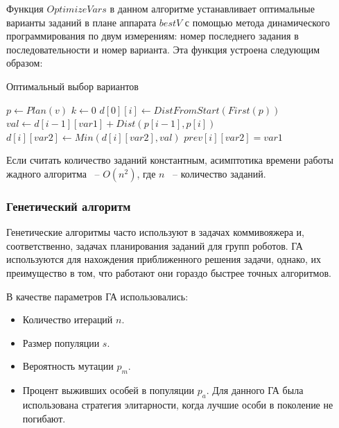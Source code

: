 \documentclass[a4paper,14pt,russian]{article}
\begin{document}
Функция $OptimizeVars$ в данном алгоритме устанавливает оптимальные варианты заданий в плане аппарата $bestV$ с помощью метода динамического программирования по двум измерениям: номер последнего задания в последовательности и номер варианта. Эта функция устроена следующим образом:

\pagebreak

\begin{algorithm}
\caption{Оптимальный выбор вариантов}\label{alg:dynamic}
\begin{algorithmic}[1]
    \State $p \gets Plan(v)$
    \State $k \gets 0$
        \State $d[0][i] \gets DistFromStart(First(p))$
    \EndFor
                \State $val \gets d[i - 1][var1] + Dist(p[i - 1], p[i])$
                    \State $d[i][var2] \gets Min(d[i][var2], val)$
                    \State $prev[i][var2] = var1$
                \EndIf
            \EndFor
        \EndFor
    \EndFor
    \State {}
\EndProcedure
\end{algorithmic}
\end{algorithm}

Если считать количество заданий константным, асимптотика времени работы жадного алгоритма ~-- $O(n^2)$, где $n$ ~-- количество заданий.


\subsubsection{Генетический алгоритм}
Генетические алгоритмы часто используют в задачах коммивояжера и, соответственно, задачах планирования заданий для групп роботов. ГА используются для нахождения приближенного решения задачи, однако, их преимущество в том, что работают они гораздо быстрее точных алгоритмов.

В качестве параметров ГА использовались:
\begin{itemize}
\item Количество итераций $n$.
\item Размер популяции $s$.
\item Вероятность мутации $p_m$.
\item Процент выживших особей в популяции $p_a$. Для данного ГА была использована стратегия элитарности, когда лучшие особи в поколение не погибают.
\end{itemize}
\end{document}
